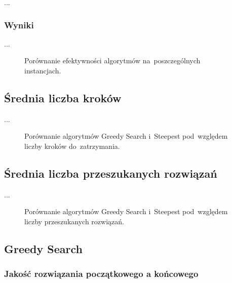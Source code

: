 ...

\subsubsection{Wyniki}

...

\begin{figure}
\begin{center}
\end{center}
\caption{Porównanie efektywności algorytmów na~poszczególnych instancjach.}
\label{fig:eff}
\end{figure}

\subsection{Średnia liczba kroków}

...

\begin{figure}
\begin{center}
\end{center}
\caption{Porównanie algorytmów Greedy Search i~Steepest pod~względem liczby kroków do~zatrzymania.}
\label{fig:steps}
\end{figure}

\subsection{Średnia liczba przeszukanych rozwiązań}

...

\begin{figure}
\begin{center}
\end{center}
\caption{Porównanie algorytmów Greedy Search i~Steepest pod~względem liczby przeszukanych rozwiązań.}
\label{fig:nsol}
\end{figure}

\subsection{Greedy Search}

\subsubsection{Jakość rozwiązania początkowego a końcowego}

